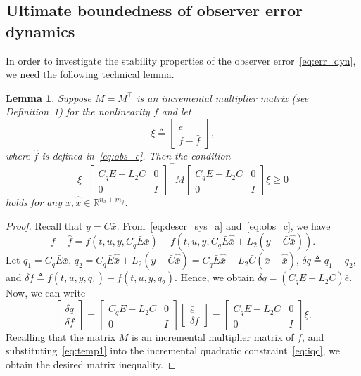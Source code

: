 \documentclass[times, doublespace]{rncauth}
\newcommand{\hb}[1]{\hat{\bar{#1}}}
\newtheorem{lemma}{Lemma}
\begin{document}
\subsection{Ultimate boundedness of observer error dynamics}
In order to investigate the stability properties of the observer error~\eqref{eq:err_dyn}, we need the following technical lemma.
\begin{lemma}\label{lem:1}
	Suppose $M=M^\top$ is an incremental multiplier matrix (see Definition~1) for the nonlinearity $f$ and let $$\xi \triangleq \begin{bmatrix}
	\bar e \\ f-\hat f
	\end{bmatrix},$$ where $\hat f$ is defined in~\eqref{eq:obs_c}. Then the condition
	\[
	\xi^\top \begin{bmatrix}
	C_q \bar E - L_2 \bar C & 0 \\ 0 & I
	\end{bmatrix}^\top M \begin{bmatrix}
	C_q\bar E  - L_2 \bar C & 0 \\ 0 & I
	\end{bmatrix}\xi \ge 0
	\]
	holds for any $\bar x, \hb{x}\in\mathbb{R}^{n_x+m_y}$.
\end{lemma}
\begin{proof}
	Recall that $y = \bar C\bar x$. From~\eqref{eq:descr_sys_a} and~\eqref{eq:obs_c}, we have 
	\[
	f-\hat f = f(t,u,y, C_q \bar E \bar x) - f(t,u,y, C_q \bar E\hb x + L_2(y - \bar C\hb x)).
	\]
	Let $q_1 = C_q \bar E \bar x$, $q_2 = C_q \bar E\hb x + L_2(y - \bar C\hb x) = C_q \bar E \hb x + L_2\bar C (\bar x - \hb x)$, $\delta q \triangleq q_1 - q_2$, and $\delta f \triangleq f(t,u,y,q_1) - f(t,u,y,q_2)$. 
	Hence, we obtain $\delta q = (C_q \bar E - L_2 \bar C)\bar e$.
	Now, we can write
	\begin{equation}
	\label{eq:temp1}
	\begin{bmatrix}
	\delta q \\ \delta f
	\end{bmatrix} = \begin{bmatrix}
	C_q \bar E - L_2 \bar C & 0 \\ 0 & I
	\end{bmatrix}\begin{bmatrix}
	\bar e \\ \delta f
	\end{bmatrix}= \begin{bmatrix}
	C_q \bar E - L_2 \bar C & 0 \\ 0 & I
	\end{bmatrix}\xi.
	\end{equation}
	Recalling that the matrix $M$ is an incremental multiplier matrix of $f$, and substituting~\eqref{eq:temp1} into the incremental quadratic constraint~\eqref{eq:iqc}, we obtain the desired matrix inequality.
\end{proof}
\end{document}
